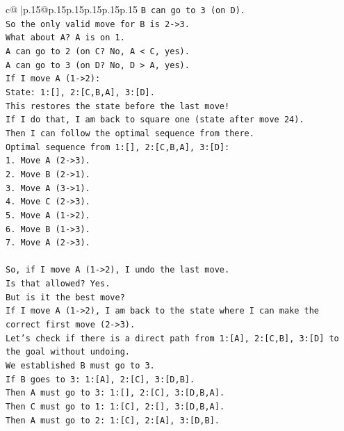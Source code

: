 \documentclass{article}
\begin{document}
{\begin{supertabular}{c@{$\;$}|p{.15\linewidth}@{}p{.15\linewidth}p{.15\linewidth}p{.15\linewidth}p{.15\linewidth}p{.15\linewidth}}
{{{\texttt{B can go to 3 (on D).} \\
\texttt{So the only valid move for B is 2{-}>3.} \\
\texttt{What about A? A is on 1.} \\
\texttt{A can go to 2 (on C? No, A < C, yes).} \\
\texttt{A can go to 3 (on D? No, D > A, yes).} \\
\texttt{If I move A (1{-}>2):} \\
\texttt{State: 1:{[}{]}, 2:{[}C,B,A{]}, 3:{[}D{]}.} \\
\texttt{This restores the state before the last move!} \\
\texttt{If I do that, I am back to square one (state after move 24).} \\
\texttt{Then I can follow the optimal sequence from there.} \\
\texttt{Optimal sequence from 1:{[}{]}, 2:{[}C,B,A{]}, 3:{[}D{]}:} \\
\texttt{1. Move A (2{-}>3).} \\
\texttt{2. Move B (2{-}>1).} \\
\texttt{3. Move A (3{-}>1).} \\
\texttt{4. Move C (2{-}>3).} \\
\texttt{5. Move A (1{-}>2).} \\
\texttt{6. Move B (1{-}>3).} \\
\texttt{7. Move A (2{-}>3).} \\
\\ 
\texttt{So, if I move A (1{-}>2), I undo the last move.} \\
\texttt{Is that allowed? Yes.} \\
\texttt{But is it the best move?} \\
\texttt{If I move A (1{-}>2), I am back to the state where I can make the correct first move (2{-}>3).} \\
\texttt{Let's check if there is a direct path from 1:{[}A{]}, 2:{[}C,B{]}, 3:{[}D{]} to the goal without undoing.} \\
\texttt{We established B must go to 3.} \\
\texttt{If B goes to 3: 1:{[}A{]}, 2:{[}C{]}, 3:{[}D,B{]}.} \\
\texttt{Then A must go to 3: 1:{[}{]}, 2:{[}C{]}, 3:{[}D,B,A{]}.} \\
\texttt{Then C must go to 1: 1:{[}C{]}, 2:{[}{]}, 3:{[}D,B,A{]}.} \\
\texttt{Then A must go to 2: 1:{[}C{]}, 2:{[}A{]}, 3:{[}D,B{]}.} \\
}}}
\end{supertabular}}
\end{document}
